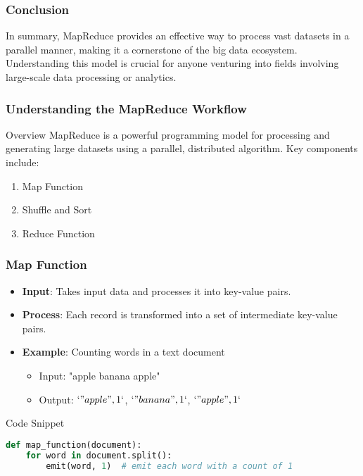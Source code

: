\documentclass[aspectratio=169]{beamer}
\begin{document}
\begin{frame}
    \frametitle{Conclusion}
    In summary, MapReduce provides an effective way to process vast datasets in a parallel manner, making it a cornerstone of the big data ecosystem. Understanding this model is crucial for anyone venturing into fields involving large-scale data processing or analytics.
\end{frame}

\begin{frame}
    \titlepage
\end{frame}

\begin{frame}
    \frametitle{Understanding the MapReduce Workflow}
    \begin{block}{Overview}
        MapReduce is a powerful programming model for processing and generating large datasets using a parallel, distributed algorithm. Key components include:
        \begin{enumerate}
            \item Map Function
            \item Shuffle and Sort
            \item Reduce Function
        \end{enumerate}
    \end{block}
\end{frame}

\begin{frame}[fragile]
    \frametitle{Map Function}
    \begin{itemize}
        \item \textbf{Input}: Takes input data and processes it into key-value pairs.
        \item \textbf{Process}: Each record is transformed into a set of intermediate key-value pairs.
        
        \item \textbf{Example}: Counting words in a text document
        \begin{itemize}
            \item Input: "apple banana apple"
            \item Output: \(`"apple", 1`\), \(`"banana", 1`\), \(`"apple", 1`\)
        \end{itemize}
    \end{itemize}
    \begin{block}{Code Snippet}
        \begin{lstlisting}[language=Python]
def map_function(document):
    for word in document.split():
        emit(word, 1)  # emit each word with a count of 1
        \end{lstlisting}
    \end{block}
\end{frame}
\end{document}
